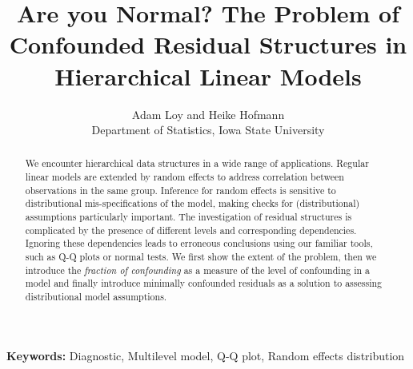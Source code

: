 \documentclass[12pt]{article} %
\title{Are you Normal? The Problem of Confounded Residual Structures in Hierarchical Linear Models}
\author{
	Adam Loy and Heike Hofmann\\
	Department of Statistics,
	Iowa State University
}
\begin{document}
\maketitle


\begin{abstract}
We encounter hierarchical data structures in a wide range of applications. Regular linear models are extended by random effects to address correlation between observations in the same group. Inference for random effects is sensitive to  distributional mis-specifications of the model, making checks for (distributional) assumptions particularly important.  The investigation of residual structures is complicated by the presence of  different levels and corresponding  dependencies. Ignoring these dependencies leads to  erroneous conclusions using our familiar tools, such as Q-Q plots or normal tests. We first show the extent of the problem, then we introduce the {\it fraction of confounding} as a measure of the level of confounding in a model and finally introduce minimally confounded residuals as a solution to assessing distributional model assumptions.
\end{abstract}
{\bf Keywords:} Diagnostic, Multilevel model, Q-Q plot, Random effects distribution


\end{document}
